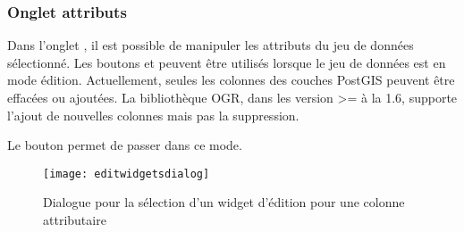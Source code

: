 \subsubsection{Onglet attributs}\label{label_attributes}
Dans l'onglet , il est possible de manipuler les attributs du jeu de données sélectionné. Les boutons  et  peuvent être utilisés lorsque le jeu de données est en mode édition. Actuellement, seules les colonnes des couches PostGIS peuvent être effacées ou ajoutées. La bibliothèque OGR, dans les version >= à la 1.6, supporte l'ajout de nouvelles colonnes mais pas la suppression.

Le bouton  permet de passer dans ce mode.


\begin{figure}[H]
   \begin{center}
   \caption{Dialogue pour la sélection d'un widget d'édition pour une colonne attributaire \nixcaption}\label{fig:editwidget}\smallskip
   \texttt{[image: editwidgetsdialog]}
\end{center}
\end{figure}

